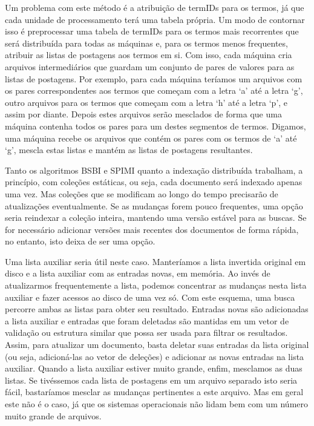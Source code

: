 Um problema com este método é a atribuição de termIDs para os termos, já que cada unidade de processamento terá uma tabela própria. Um modo de contornar isso é preprocessar uma tabela de termIDs para os termos mais recorrentes que será distribuída para todas as máquinas e, para os termos menos frequentes, atribuir as listas de postagens aos termos em si. Com isso, cada máquina cria arquivos intermediários que guardam um conjunto de pares de valores para as listas de postagens. Por exemplo, para cada máquina teríamos um arquivos com os pares correspondentes aos termos que começam com a letra ‘a’ até a letra ‘g’, outro arquivos para os termos que começam com a letra ‘h’ até a letra ‘p’, e assim por diante. Depois estes arquivos serão mesclados de forma que uma máquina contenha todos os pares para um destes segmentos de termos. Digamos, uma máquina recebe os arquivos que contém os pares com os termos de ‘a’ até ‘g’, mescla estas listas e mantém as listas de postagens resultantes.

Tanto os algoritmos BSBI e SPIMI quanto a indexação distribuída trabalham, a princípio, com coleções estáticas, ou seja, cada documento será indexado apenas uma vez. Mas coleções que se modificam ao longo do tempo precisarão de atualizações eventualmente. Se as mudanças forem pouco frequentes, uma opção seria reindexar a coleção inteira, mantendo uma versão estável para as buscas. Se for necessário adicionar versões mais recentes dos documentos de forma rápida, no entanto, isto deixa de ser uma opção. 

Uma lista auxiliar seria útil neste caso. Manteríamos a lista invertida original em disco e a lista auxiliar com as entradas novas, em memória. Ao invés de atualizarmos frequentemente a lista, podemos concentrar as mudanças nesta lista auxiliar e fazer acessos ao disco de uma vez só. Com este esquema, uma busca percorre ambas as listas para obter seu resultado. Entradas novas são adicionadas a lista auxiliar e entradas que foram deletadas são mantidas em um vetor de validação ou estrutura similar que possa ser usada para filtrar os resultados. Assim, para atualizar um documento, basta deletar suas entradas da lista original (ou seja, adicioná-las ao vetor de deleções) e adicionar as novas entradas na lista auxiliar. Quando a lista auxiliar estiver muito grande, enfim, mesclamos as duas listas. Se tivéssemos cada lista de postagens em um arquivo separado isto seria fácil, bastaríamos mesclar as mudanças pertinentes a este arquivo. Mas em geral este não é o caso, já que os sistemas operacionais não lidam bem com um número muito grande de arquivos. 

